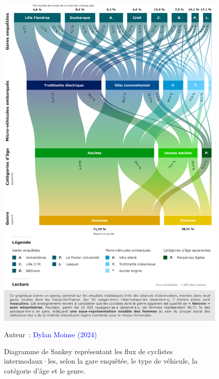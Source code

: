 \begin{refsegment}
    \begin{figure}[h!]\vspace*{4pt}
        \caption{Diagramme de Sankey représentant les flux de cyclistes intermodaux·les, selon la gare enquêtée, le type de véhicule, la catégorie d'âge et le genre.}
        \label{fig-chap4:genre-age}
        \centerline{\includegraphics[width=1\columnwidth]{src/Figures/Chap-4/FR_Genre_Age.pdf}}
        \vspace{5pt}
        \begin{flushright}\scriptsize{
        Auteur~: \textcolor{blue}{Dylan Moinse (2024)}
        }\end{flushright}
    \end{figure}


\end{refsegment}
